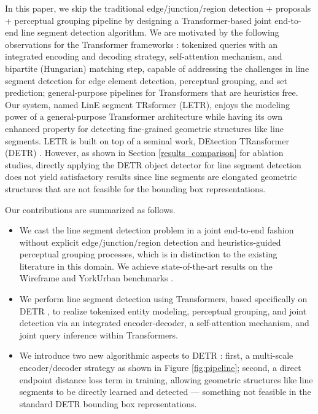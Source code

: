 \documentclass[final]{cvpr}
\begin{document}
In this paper, we skip the traditional edge/junction/region detection + proposals + perceptual grouping pipeline by designing a Transformer-based \cite{vaswani2017attention,carion2020end} joint end-to-end line segment detection algorithm. We are motivated by the following observations for the Transformer frameworks \cite{vaswani2017attention,carion2020end}: tokenized queries with an integrated encoding and decoding strategy, self-attention mechanism, and bipartite (Hungarian) matching step, capable of addressing the challenges in line segment detection for edge element detection, perceptual grouping, and set prediction; general-purpose pipelines for Transformers that are heuristics free. Our system, named LinE segment TRsformer (LETR), enjoys the modeling power of a general-purpose Transformer architecture while having its own enhanced property for detecting fine-grained geometric structures like line segments. LETR is built on top of a seminal work, DEtection TRansformer (DETR) \cite{carion2020end}. However, as shown in Section \ref{results_comparison} for ablation studies, directly applying the DETR object detector \cite{carion2020end} for line segment detection does not yield satisfactory results since line segments are elongated geometric structures that are not feasible for the bounding box representations.

Our contributions are summarized as follows.
\begin{itemize}
 \setlength\itemsep{0mm}
 \setlength{\itemindent}{0mm}
    \item We cast the line segment detection problem in a joint end-to-end fashion without explicit edge/junction/region detection and heuristics-guided perceptual grouping processes, which is in distinction to the existing literature in this domain. We achieve state-of-the-art results on the Wireframe \cite{huang2018learning} and YorkUrban benchmarks \cite{denis2008efficient}. 
    \item We perform line segment detection using Transformers, based specifically on DETR \cite{carion2020end}, to realize tokenized entity modeling, perceptual grouping, and joint detection via an integrated encoder-decoder, a self-attention mechanism, and joint query inference within Transformers.
    \item We introduce two new algorithmic aspects to DETR \cite{carion2020end}: first, a multi-scale encoder/decoder strategy as shown in Figure \ref{fig:pipeline}; second, a direct endpoint distance loss term in training, allowing geometric structures like line segments to be directly learned and detected --- something not feasible in the standard DETR bounding box representations.
\end{itemize}
\end{document}

